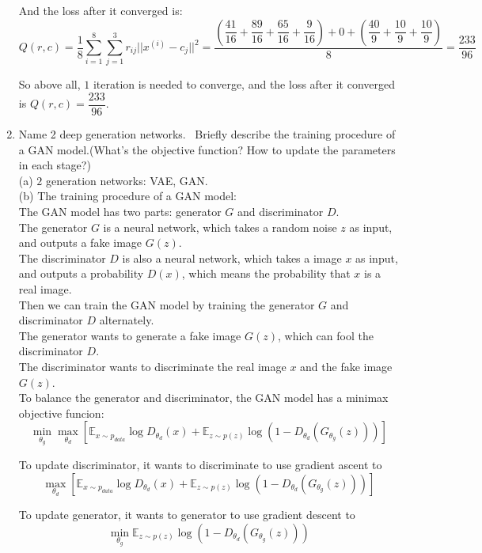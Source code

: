 \documentclass[10pt]{article}
\begin{document}
\begin{enumerate}[1.]
And the loss after it converged is:
$$Q(r,c)=\dfrac{1}{8}\sum\limits_{i=1}^8\sum\limits_{j=1}^3r_{ij}||x^{(i)}-c_j||^2=\dfrac{(\dfrac{41}{16}+\dfrac{89}{16}+\dfrac{65}{16}+\dfrac{9}{16})+0+(\dfrac{40}{9}+\dfrac{10}{9}+\dfrac{10}{9})}{8}=\dfrac{233}{96}$$
		 
So above all, $1$ iteration is needed to converge, and the loss after it converged is $Q(r,c)=\dfrac{233}{96}$.\\		 
		 
		\newpage


	\item {} Name 2 deep generation networks.~ Briefly describe the training procedure of a GAN model.(What's the objective function? How to update the parameters in each stage?)~\\
(a) $2$ generation networks: VAE, GAN.\\

(b) The training procedure of a GAN model:\\
The GAN model has two parts: generator $G$ and discriminator $D$.\\
The generator $G$ is a neural network, which takes a random noise $z$ as input, and outputs a fake image $G(z)$.\\
The discriminator $D$ is also a neural network, which takes a image $x$ as input, and outputs a probability $D(x)$, which means the probability that $x$ is a real image.\\
Then we can train the GAN model by training the generator $G$ and discriminator $D$ alternately.\\
The generator wants to generate a fake image $G(z)$, which can fool the discriminator $D$.\\
The discriminator wants to discriminate the real image $x$ and the fake image $G(z)$.\\

To balance the generator and discriminator, the GAN model has a minimax objective funcion:
$$\min_{\theta_g}\max_{\theta_d}\left[\mathbb{E}_{x\sim p_{data}}\log D_{\theta_d}(x)+\mathbb{E}_{z\sim p(z)}\log (1-D_{\theta_d}(G_{\theta_{g}}(z)))\right]$$
	
To update discriminator, it wants to discriminate to use gradient ascent to 
$$\max_{\theta_d}\left[\mathbb{E}_{x\sim p_{data}}\log D_{\theta_d}(x)+\mathbb{E}_{z\sim p(z)}\log (1-D_{\theta_d}(G_{\theta_{g}}(z)))\right]$$

To update generator, it wants to generator to use gradient descent to 
$$\min_{\theta_g}\mathbb{E}_{z\sim p(z)}\log (1-D_{\theta_d}(G_{\theta_{g}}(z)))$$



\end{enumerate}
\end{document}
